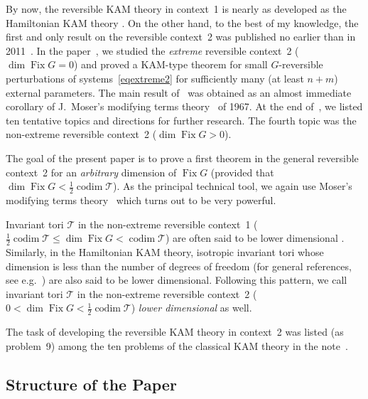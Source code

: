 \documentclass[12pt,reqno]{amsart}
\theoremstyle{definition}
\begin{document}
By now, the reversible KAM theory in context~1 is nearly as developed as the
Hamiltonian KAM theory \cite{A84,AS86,B91,BCHV09,BHN07,BH95,BHS96Gro,BHS96LNM,L01,M65,M66,M67,M73,QS93,Sch87,S86,S91,S95RMS,S95Cha,S98,S06,S07DCDS,S07Stek,WX09,WXZ10,WZX11,W01,X04,Z08}. On the other hand, to the best
of my knowledge, the first and only result on the reversible context~2 was
published no earlier than in 2011~\cite{S11}. In the paper~\cite{S11}, we
studied the \emph{extreme} reversible context~2 ($\dim\operatorname{Fix} G=0$) and proved a
KAM-type theorem for small $G$-reversible perturbations of
systems~\eqref{eqextreme2} for sufficiently many (at least $n+m$) external
parameters. The main result of~\cite{S11} was obtained as an almost immediate
corollary of J.~Moser's modifying terms theory~\cite{M67} of 1967. At the end
of~\cite{S11}, we listed ten tentative topics and directions for further
research. The fourth topic was the non-extreme reversible context~2
($\dim\operatorname{Fix} G>0$).

The goal of the present paper is to prove a first theorem in the general
reversible context~2 for an \emph{arbitrary} dimension of $\operatorname{Fix} G$ (provided
that $\dim\operatorname{Fix} G<\frac{1}{2}\operatorname{codim}{\mathcal T}$). As the principal technical tool, we
again use Moser's modifying terms theory~\cite{M67} which turns out to be very
powerful.

Invariant tori ${\mathcal T}$ in the non-extreme reversible context~1
($\frac{1}{2}\operatorname{codim}{\mathcal T}{\leqslant}\dim\operatorname{Fix} G<\operatorname{codim}{\mathcal T}$) are often said to be lower
dimensional \cite{B91,BCHV09,BHN07,BH95,BHS96Gro,BHS96LNM,L01,Sch87,S91,S95Cha,S98,S06,S07DCDS,S07Stek,WX09,WXZ10,WZX11,W01,X04,Z08}. Similarly, in
the Hamiltonian KAM theory, isotropic invariant tori whose dimension is less
than the number of degrees of freedom (for general references, see
e.g.\ \cite{AKN06,BHS96LNM,BHTB90,BS10}) are also said to be lower
dimensional. Following this pattern, we call invariant tori ${\mathcal T}$ in the
non-extreme reversible context~2 ($0<\dim\operatorname{Fix} G<\frac{1}{2}\operatorname{codim}{\mathcal T}$)
\emph{lower dimensional} as well.

The task of developing the reversible KAM theory in context~2 was listed
(as problem~9) among the ten problems of the classical KAM theory in the
note~\cite{S08}.

\subsection{Structure of the Paper}\label{struct}
\end{document}
